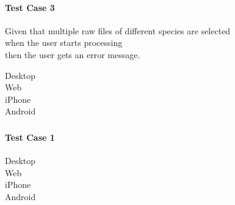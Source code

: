 \paragraph*{Test Case 3}
Given that multiple raw files of different species are selected \\ when the user starts processing \\ then the user gets an error message.
\begin{description}
 \item[Desktop]
 \item[Web]
 \item[iPhone] \xmark
 \item[Android]
\end{description}











\subsubsection{}
\paragraph*{Test Case 1}
\begin{description}
 \item[Desktop]
 \item[Web]
 \item[iPhone]
 \item[Android]
\end{description}






















